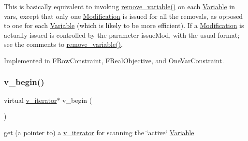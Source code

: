 This is basically equivalent to invoking \mbox{\hyperlink{group___thin_var_dep_interface___c_l_a_s_s_e_s_gad6726141a0cbe6a0410a2b396809dade}{remove\+\_\+variable()}} on each \mbox{\hyperlink{class_s_m_spp__di__unipi__it_1_1_variable}{Variable}} in vars, except that only one \mbox{\hyperlink{class_s_m_spp__di__unipi__it_1_1_modification}{Modification}} is issued for all the removals, as opposed to one for each \mbox{\hyperlink{class_s_m_spp__di__unipi__it_1_1_variable}{Variable}} (which is likely to be more efficient). If a \mbox{\hyperlink{class_s_m_spp__di__unipi__it_1_1_modification}{Modification}} is actually issued is controlled by the parameter issue\+Mod, with the usual format; see the comments to \mbox{\hyperlink{group___thin_var_dep_interface___c_l_a_s_s_e_s_gad6726141a0cbe6a0410a2b396809dade}{remove\+\_\+variable()}}. 

Implemented in \mbox{\hyperlink{class_s_m_spp__di__unipi__it_1_1_f_row_constraint_a46c11bb15648f9976eee469c53099b11}{F\+Row\+Constraint}}, \mbox{\hyperlink{class_s_m_spp__di__unipi__it_1_1_f_real_objective_a46c11bb15648f9976eee469c53099b11}{F\+Real\+Objective}}, and \mbox{\hyperlink{class_s_m_spp__di__unipi__it_1_1_one_var_constraint_a46c11bb15648f9976eee469c53099b11}{One\+Var\+Constraint}}.

\mbox{\label{group___thin_var_dep_interface___c_l_a_s_s_e_s_ga645ab1f1a40dea7fdcef536081c78613}} 
\subsubsection{\texorpdfstring{v\+\_\+begin()}{v\_begin()}\hspace{0.1cm}{\footnotesize\ttfamily [1/2]}}
{\footnotesize\ttfamily virtual \mbox{\hyperlink{class_s_m_spp__di__unipi__it_1_1_thin_var_dep_interface_1_1v__iterator}{v\+\_\+iterator}}$\ast$ v\+\_\+begin (\begin{DoxyParamCaption}\item[{void}]{ }\end{DoxyParamCaption})\hspace{0.3cm}{\ttfamily [pure virtual]}}



get (a pointer to) a \mbox{\hyperlink{class_s_m_spp__di__unipi__it_1_1_thin_var_dep_interface_1_1v__iterator}{v\+\_\+iterator}} for scanning the \char`\"{}active\char`\"{} \mbox{\hyperlink{class_s_m_spp__di__unipi__it_1_1_variable}{Variable}} 

